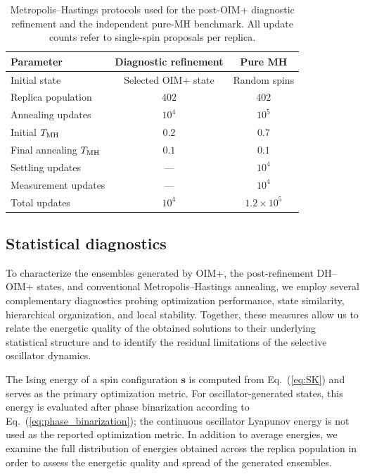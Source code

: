 \documentclass[
reprint,
amsmath,amssymb,
aps,
pre,
floatfix,
]{revtex4-2}
\begin{document}
\begin{table}[htb]
\caption{
Metropolis--Hastings protocols used for the post-OIM+ diagnostic
refinement and the independent pure-MH benchmark. All update counts
refer to single-spin proposals per replica.
}
\label{tab:mh_protocols}
\begin{ruledtabular}
\begin{tabular}{lcc}
Parameter & Diagnostic refinement & Pure MH \\
\hline
Initial state
& Selected OIM+ state
& Random spins \\

Replica population
& $402$
& $402$ \\

Annealing updates
& $10^4$
& $10^5$ \\

Initial $T_{\rm MH}$
& $0.2$
& $0.7$ \\

Final annealing $T_{\rm MH}$
& $0.1$
& $0.1$ \\

Settling updates
& ---
& $10^4$ \\

Measurement updates
& ---
& $10^4$ \\

Total updates
& $10^4$
& $1.2\times10^5$ \\
\end{tabular}
\end{ruledtabular}
\end{table}


\subsection{Statistical diagnostics}
To characterize the ensembles generated by OIM+, the post-refinement DH--OIM+ states, and conventional Metropolis--Hastings annealing, we employ several complementary diagnostics probing optimization performance, state similarity, hierarchical organization, and local stability. Together, these measures allow us to relate the energetic quality of the obtained solutions to their underlying statistical structure and to identify the residual limitations of the selective oscillator dynamics.

The Ising energy of a spin configuration $\mathbf{s}$ is computed from Eq.~(\ref{eq:SK}) and serves as the primary optimization metric. For oscillator-generated states, this energy is evaluated after phase binarization according to Eq.~(\ref{eq:phase_binarization}); the continuous oscillator Lyapunov energy is not used as the reported optimization metric. In addition to average energies, we examine the full distribution of energies obtained across the replica population in order to assess the energetic quality and spread of the generated ensembles.
\end{document}
